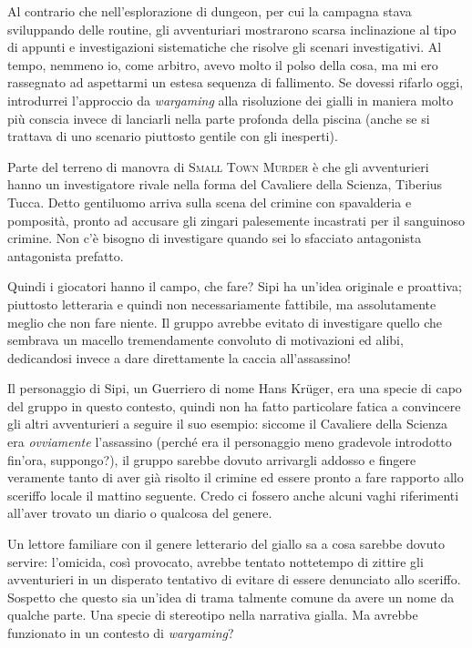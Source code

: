 Al contrario che nell'esplorazione di dungeon, per cui la campagna stava sviluppando delle routine, gli avventuriari mostrarono scarsa inclinazione al tipo di appunti e investigazioni sistematiche che risolve gli scenari investigativi. Al tempo, 
nemmeno io, come arbitro, avevo molto il polso della cosa, ma mi ero rassegnato ad aspettarmi un estesa sequenza di fallimento. Se dovessi rifarlo oggi, introdurrei l'approccio da \textit{wargaming} alla risoluzione dei gialli in maniera molto più conscia invece di lanciarli nella parte profonda della piscina (anche se si trattava di uno scenario piuttosto gentile con gli inesperti).

Parte del terreno di manovra di \textsc{Small Town Murder} è che gli avventurieri hanno un investigatore rivale nella forma del Cavaliere della Scienza, Tiberius Tucca. Detto gentiluomo arriva sulla scena del crimine con spavalderia e pomposità, pronto ad accusare gli zingari palesemente incastrati per il sanguinoso crimine. Non c'è bisogno di investigare quando sei lo sfacciato antagonista antagonista prefatto.

Quindi i giocatori hanno il campo, che fare? Sipi ha un'idea originale e proattiva; piuttosto letteraria e quindi non necessariamente fattibile, ma assolutamente meglio che non fare niente. Il gruppo avrebbe evitato di investigare quello che sembrava un macello tremendamente convoluto di motivazioni ed alibi, dedicandosi invece a dare direttamente la caccia all'assassino!

Il personaggio di Sipi, un Guerriero di nome Hans Krüger, era una specie di capo del gruppo in questo contesto, quindi non ha fatto particolare fatica a convincere gli altri avventurieri a seguire il suo esempio: siccome il Cavaliere della Scienza era \textit{ovviamente} l'assassino (perché era il personaggio meno gradevole introdotto fin'ora, suppongo?), il gruppo sarebbe dovuto arrivargli addosso e fingere veramente tanto di aver già risolto il crimine ed essere pronto a fare rapporto allo sceriffo locale il mattino seguente. Credo ci fossero anche alcuni vaghi riferimenti all'aver trovato un diario o qualcosa del genere.

Un lettore familiare con il genere letterario del giallo sa a cosa sarebbe dovuto servire: l'omicida, così provocato, avrebbe tentato nottetempo di zittire gli avventurieri in un disperato tentativo di evitare di essere denunciato allo sceriffo. Sospetto che questo sia un'idea di trama talmente comune da avere un nome da qualche parte. Una specie di stereotipo nella narrativa gialla. Ma avrebbe funzionato in un contesto di \textit{wargaming}?

